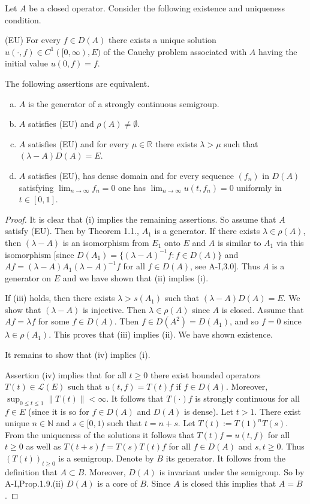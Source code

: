\begin{corollary}\label{cor:1.2}
Let $A$ be a closed operator.
Consider the following existence and uniqueness condition.

(EU) For every $f \in D(A)$ there exists a unique solution $u(\cdot,f)\in C^{1}([0,\infty),E)$ of the Cauchy problem associated with $A$ having the initial value $u(0,f) = f$.

The following assertions are equivalent.
\begin{enumerate}[(a)]
\item $A$ is the generator of a strongly continuous semigroup.
\item $A$ satisfies (EU) and $\rho(A) \neq \emptyset$.
\item $A$ satisfies (EU) and for every $\mu \in \mathbb{R}$ there exists $\lambda > \mu$ such that $(\lambda-A)D(A) = E$.
\item $A$ satisfies (EU), has dense domain and for every sequence $(f_{n})$ in $D(A)$ satisfying $\lim_{n \to \infty}f_{n} = 0$ one has $\lim_{n \to \infty}u(t,f_{n}) = 0$ uniformly in $t \in [0,1]$.
\end{enumerate}
\end{corollary}

\begin{proof}
It is clear that (i) implies the remaining assertions.
So assume that $A$ satisfy (EU).
Then by Theorem 1.1., $A_{1}$ is a generator.
If there exists $\lambda \in \rho(A)$, then $(\lambda-A)$ is an isomorphism from $E_{1}$ onto $E$ and $A$ is similar to $A_{1}$ via this isomorphism [since $D(A_{1}) = \{(\lambda-A)^{-1}f : f \in D(A)\}$ and $Af = (\lambda-A)A_{1}(\lambda-A)^{-1}f$ for all $f \in D(A)$, see A-I,3.0].
Thus $A$ is a generator on $E$ and we have shown that (ii) implies (i).

If (iii) holds, then there exists $\lambda > s(A_{1})$ such that $(\lambda-A)D(A) = E$.
We show that $(\lambda-A)$ is injective.
Then $\lambda \in \rho(A)$ since $A$ is closed.
Assume that $Af = \lambda f$ for some $f \in D(A)$.
Then $f \in D(A^{2}) = D(A_{1})$, and so $f = 0$ since $\lambda \in \rho(A_{1})$.
This proves that (iii) implies (ii).
We have shown existence.


It remains to show that (iv) implies (i).

Assertion (iv) implies that for all $t \geq 0$ there exist bounded operators $T(t) \in \mathcal{L}(E)$ such that $u(t,f) = T(t)f$ if $f \in D(A)$.
Moreover, $\sup_{0\leq t\leq1} \|T(t)\| < \infty$.
It follows that $T(\cdot)f$ is strongly continuous for all $f \in E$ (since it is so for $f \in D(A)$ and $D(A)$ is dense).
Let $t > 1$.
There exist unique $n \in \mathbb{N}$ and $s \in [0,1)$ such that $t = n + s$.
Let $T(t) := T(1)^{n}T(s)$.
From the uniqueness of the solutions it follows that $T(t)f = u(t,f)$ for all $t \geq 0$ as well as $T(t+s)f = T(s)T(t)f$ for all $f \in D(A)$ and $s,t \geq 0$.
Thus $(T(t))_{t\geq0}$ is a semigroup.
Denote by $B$ its generator.
It follows from the definition that $A \subset B$.
Moreover, $D(A)$ is invariant under the semigroup.
So by A-I,Prop.1.9.(ii) $D(A)$ is a core of $B$.
Since $A$ is closed this implies that $A = B$.
\end{proof}

